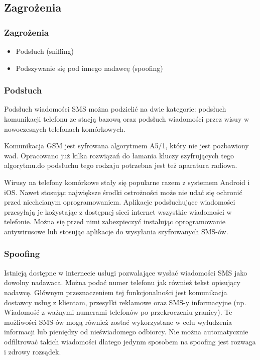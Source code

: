 \documentclass[xcolor=table]{beamer}
\begin{document}
\subsection{Zagrożenia}
\begin{frame}
  \frametitle{Zagrożenia}

\begin{itemize}
  \item Podsłuch (sniffing) 
  \item Podszywanie się pod innego nadawcę (spoofing)
\end{itemize}

\end{frame}

\begin{frame}[allowframebreaks]
  \frametitle{Podsłuch}

  Podsłuch wiadomości SMS można podzielić na dwie kategorie: podsłuch
  komunikacji telefonu ze stacją bazową oraz podsłuch wiadomości przez wisuy w
  nowoczesnych telefonach komórkowych.

  Komunikacja GSM jest syfrowana algorytmem A5/1, który nie jest pozbawiony
  wad. Opracowano już kilka rozwiązań do łamania kluczy szyfrujących tego
  algorytmu.do podsłuchu tego rodzaju potrzebna jest też aparatura radiowa.

  \framebreak

  Wirusy na telefony komórkowe stały się popularne razem z systemem Android i
  iOS. Nawet stosując największe środki ostrożności może nie udać się ochronić
  przed niechcianym oprogramowaniem. Aplikacje podsłuchujące wiadomości
  przesyłają je kożystając z dostępnej sieci internet wszystkie wiadomości w
  telefonie. Można się przed nimi zabezpieczyć instalując oprogramowanie
  antywirusowe lub stosując aplikacje do wysyłania szyfrowanych SMS-ów.
\end{frame}

\begin{frame}
  \frametitle{Spoofing}
  
  Istnieją dostępne w internecie usługi pozwalające wysłać wiadomości SMS jako
  dowolny nadawaca. Można podać numer telefonu jak również tekst opisujący
  nadawcę. Głównym przeznaczeniem tej funkcjonalności jest komunikacja dostawcy
  usług z klientam, przesyłki reklamowe oraz SMS-y informacyjne (np. Wiadomość
  z ważnymi numerami telefonów po przekroczeniu granicy). Te możliwości SMS-ów
  mogą również zostać wykorzystane w celu wyłudzenia informacji lub pieniędzy
  od nieświadomego odbiorcy. Nie można automatycznie odfiltrować takich
  wiadomości dlatego jedynm sposobem na spoofing jest rozwaga i zdrowy
  rozsądek.

\end{frame}
\end{document}
